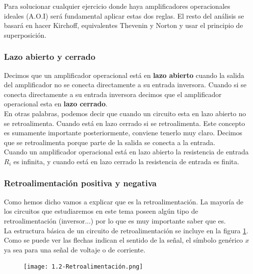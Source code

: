 \documentclass[12pt,a4paper]{article}
\numberwithin{equation}{section}
\numberwithin{figure}{section}
\begin{document}
Para solucionar cualquier ejercicio donde haya amplificadores operacionales ideales (A.O.I) será fundamental aplicar estas dos reglas. El resto del análisis se basará en hacer Kirchoff, equivalentes Thevenin y Norton y usar el principio de superposición.



\subsubsection{Lazo abierto y cerrado}

Decimos 	que un amplificador operacional está en \textbf{lazo abierto} cuando la salida del amplificador no se conecta directamente a su entrada inversora. Cuando si se conecta directamente a su entrada inversora decimos que el amplificador operacional esta en \textbf{lazo cerrado}. \\

En otras palabras, podemos decir que cuando un circuito esta en
 lazo abierto no se retroalimenta. Cuando está en lazo cerrado si se retroalimenta. Este concepto es sumamente importante posteriormente, conviene tenerlo muy claro. Decimos que se retroalimenta porque parte de la salida se conecta a la entrada. \\
  
 
Cuando un amplificador operacional está en lazo abierto la resistencia de entrada $R_i$ es infinita, y cuando está en lazo cerrado la resistencia de entrada es finita. 

\subsubsection{Retroalimentación positiva y negativa}


Como hemos dicho vamos a explicar que es la retroalimentación. La mayoría de los circuitos que estudiaremos en este tema poseen algún  tipo de retroalimentación (inversor...) por lo que es muy importante saber que es. \\

La estructura básica de un circuito de retroalimentación se incluye en la figura \ref{Fig:1.2.3-Retroalimentacion}. Como se puede ver las flechas indican el sentido de la señal, el símbolo genérico $x$ ya sea para una señal de voltaje o de corriente. 



\begin{figure}[h!] \centering
\texttt{[image: 1.2-Retroalimentación.png]}
\caption{}
\label{Fig:1.2.3-Retroalimentacion}
\end{figure}
\end{document}
